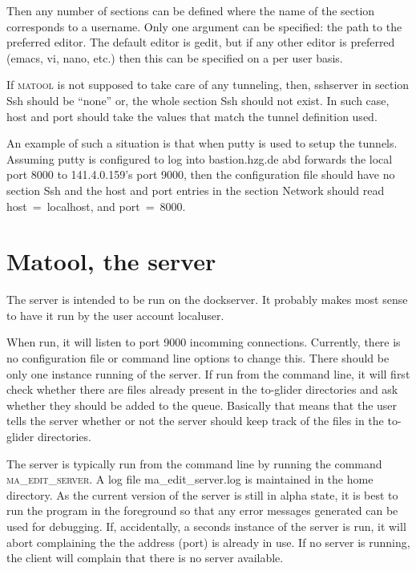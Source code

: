 \documentclass{article}
\newcommand{\mtc}{\textsc{matool}}
\newcommand{\mts}{\textsc{ma\_edit\_server}}
\begin{document}
Then any number of sections can be defined where the name of the
section corresponds to a username. Only one argument can be specified:
the path to the preferred editor. The default editor is gedit, but if
any other editor is preferred (emacs, vi, nano, etc.) then this can be
specified on a per user basis.

If \mtc{} is not supposed to take care of any tunneling, then,
sshserver in section Ssh should be ``none'' or, the whole section Ssh
should not exist. In such case, host and port should take the values
that match the tunnel definition used. 

An example of such a situation is that when putty is used to setup the
tunnels. Assuming putty is configured to log into bastion.hzg.de abd
forwards the local port 8000 to 141.4.0.159's port 9000, then the
configuration file should have no section Ssh and the host and port
entries in the section Network should read host~=~localhost, and
port~=~8000.

\section{Matool, the server}
The server is intended to be run on the dockserver. It probably makes
most sense to have it run by the user account localuser. 

When run, it will listen to port 9000 incomming
connections. Currently, there is no configuration file or command line
options to change this. There should be only one instance running of
the server. If run from the command line, it will first check whether
there are files already present in the to-glider directories and ask
whether they should be added to the queue. Basically that means that
the user tells the server whether or not the server should keep track
of the files in the to-glider directories.

The server is typically run from the command line by running the
command  \mts{}. A log file ma\_edit\_server.log is maintained in the
home directory. As the current version of the server is still in alpha
state, it is best to run the program in the foreground so that any
error messages generated can be used for debugging. If, accidentally,
a seconds instance of the server is run, it will abort complaining the
the address (port) is already in use. If no server is running, the
client will complain that there is no server available.
\end{document}
